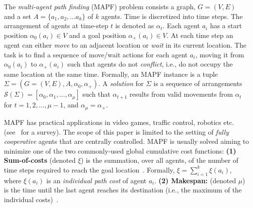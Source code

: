 \documentclass[letterpaper]{article}
\newcommand{\commenter}[3]{$[$\uppercase{#1}#2:#3$]$  \\}
\newcommand{\roni}[2]{\commenter{roni}{#1}{#2}}
\begin{document}
The {\em multi-agent path finding} (MAPF) problem consists  a graph, $G=(V,E)$
and a set $A=\{a_1, a_2,\dots a_k\}$ of $k$ agents. Time is discretized into
time steps. The arrangement of agents at time-step $t$ is denoted as
$\alpha_t$. Each agent $a_i$ has a start position $\alpha_0(a_i) \in V$ and a
goal position $\alpha_+(a_i) \in V$.  At each time step an agent can either
{\em move} to an adjacent location or {\em wait} in its current location.
The task is to find a sequence of move/wait actions for each agent $a_i$, moving it from
$\alpha_0(a_i)$ to $\alpha_+(a_i)$ such that agents do not {\em conflict},
i.e., do not occupy the same location at the same time. Formally, an MAPF
instance is a tuple $\Sigma=(G=(V,E),A,\alpha_0,\alpha_+)$. A \textit{solution}
for $\Sigma$ is a sequence of arrangements
$\mathcal{S}(\Sigma)=[\alpha_0,\alpha_1,...,\alpha_{\mu}]$ such that
 $\alpha_{t+1}$ results from valid movements from
$\alpha_{t}$ for $t=1,2,...,\mu-1$,
and $\alpha_{\mu}=\alpha_+$.

MAPF has practical applications in video games, traffic control, robotics etc.
(see~\cite{CBSJUR} for a survey). The scope of this paper is limited to the
setting of {\em fully cooperative} agents that are centrally controlled. MAPF
is usually solved aiming to minimize one of the two commonly-used global
cumulative cost functions: {\bf (1)  Sum-of-costs} (denoted $\xi$) is the
summation, over all agents, of the number of time steps required to reach the
goal
location~\cite{dresner2008aMultiagent,standley2010finding,DBLP:journals/ai/SharonSGF13,CBSJUR}.
Formally, $\xi = \sum_{i=1}^k{\xi(a_i)}$, where $\xi(a_i)$ is an
\textit{individual path cost} of agent $a_i$. {\bf (2) Makespan:} (denoted
$\mu$) is the time until the last agent reaches its destination (i.e.,
the maximum of the individual
costs)~\cite{DBLP:conf/aaai/Surynek10,DBLP:conf/ictai/Surynek14,DBLP:conf/ijcai/Surynek15}.





\end{document}
